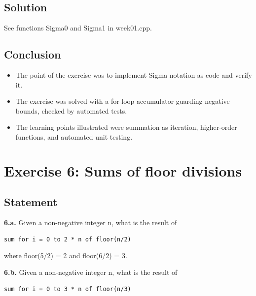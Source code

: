 \documentclass[12pt]{article}
\begin{document}
\subsection{Solution}

See functions Sigma0 and Sigma1 in week01.cpp.


\subsection{Conclusion}

\begin{itemize}

\item
  The point of the exercise was to implement Sigma notation as code and verify it.

\item
  The exercise was solved with a for-loop accumulator guarding negative bounds, checked by automated tests.

\item
  The learning points illustrated were summation as iteration, higher-order functions, and automated unit testing.

\end{itemize}


\newpage

\section{Exercise 6: Sums of floor divisions}


\subsection{Statement}

\textbf{6.a.} Given a non-negative integer n, what is the result of

\begin{verbatim}
sum for i = 0 to 2 * n of floor(n/2)
\end{verbatim}

where floor(5/2) = 2 and floor(6/2) = 3.

\textbf{6.b.} Given a non-negative integer n, what is the result of

\begin{verbatim}
sum for i = 0 to 3 * n of floor(n/3)
\end{verbatim}
\end{document}
